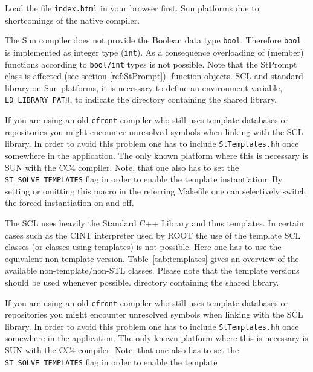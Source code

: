 \documentclass[twoside]{article}
\newcommand{\name}[1]{\textsf{#1}}%
\newcommand{\comp}[1]{\texttt{#1}}%
\begin{document}
\begin{description}
Load the file \comp{index.html} in your browser first.
    \name{Sun}  platforms due to shortcomings of the native
    compiler. 
\item The \name{Sun} compiler does not provide the Boolean data type
    \comp{bool}.  Therefore \comp{bool} is implemented as
    integer type (\comp{int}).  As a consequence overloading of
    (member) functions according to \comp{bool/int} types is not
    possible. Note that the StPrompt  class is
    affected (see section \ref{ref:StPrompt}).
function objects.
    SCL and standard library on Sun platforms, it is necessary to
    define an environment variable, \comp{LD\_LIBRARY\_PATH}, to
    indicate the directory containing the shared library.
\item If you are using an old \texttt{cfront} compiler 
    who still uses template databases
    or repositories you might encounter unresolved symbols when linking with the SCL library.
    In order to avoid this problem one has to include \comp{StTemplates.hh}
    once somewhere in the application. The only known platform where this is necessary is
    SUN with the CC4 compiler. Note, that one also has to set the \comp{ST\_SOLVE\_TEMPLATES}
    flag in order to enable the template instantiation.  By setting or omitting this macro
    in the referring Makefile
    one can selectively switch the forced instantiation on and off.
\item The SCL uses heavily the Standard C++ Library and thus templates. In certain cases
    such as the CINT  interpreter used by ROOT  the use of the
    template SCL classes (or classes using templates) is not possible.
    Here one has to
    use the equivalent non-template version. Table~\ref{tab:templates} gives an overview
    of the available non-template/non-STL classes. Please
    note that the template versions should be used whenever possible.
    directory containing the shared library.
\item If you are using an old \texttt{cfront} compiler  who still uses template databases or repositories
    you might encounter unresolved symbols when linking with the SCL
    library.  In order to avoid this problem one has to include
    \comp{StTemplates.hh} once somewhere in the
    application. The only known platform where this is necessary is
    SUN with the CC4 compiler. Note, that one also has to set the
    \comp{ST\_SOLVE\_TEMPLATES} flag in order to enable the template

\end{description}
\end{document}
